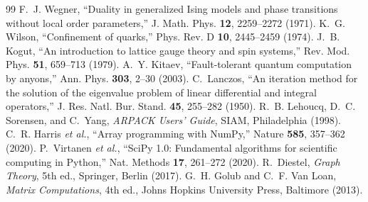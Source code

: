 \documentclass[10pt,twocolumn]{article}
\theoremstyle{definition}
\begin{document}
\begin{thebibliography}{99}\footnotesize
{} F.~J. Wegner, ``Duality in generalized Ising models and phase transitions without local order parameters,'' J. Math. Phys. \textbf{12}, 2259--2272 (1971).
 K.~G. Wilson, ``Confinement of quarks,'' Phys. Rev. D \textbf{10}, 2445--2459 (1974).
 J.~B. Kogut, ``An introduction to lattice gauge theory and spin systems,'' Rev. Mod. Phys. \textbf{51}, 659--713 (1979).
 A.~Y. Kitaev, ``Fault-tolerant quantum computation by anyons,'' Ann. Phys. \textbf{303}, 2--30 (2003).
 C.~Lanczos, ``An iteration method for the solution of the eigenvalue problem of linear differential and integral operators,'' J. Res. Natl. Bur. Stand. \textbf{45}, 255--282 (1950).
 R.~B. Lehoucq, D.~C. Sorensen, and C.~Yang, \emph{ARPACK Users' Guide}, SIAM, Philadelphia (1998).
 C.~R. Harris \emph{et al.}, ``Array programming with NumPy,'' Nature \textbf{585}, 357--362 (2020).
 P.~Virtanen \emph{et al.}, ``SciPy 1.0: Fundamental algorithms for scientific computing in Python,'' Nat. Methods \textbf{17}, 261--272 (2020).
 R.~Diestel, \emph{Graph Theory}, 5th ed., Springer, Berlin (2017).
 G.~H. Golub and C.~F. Van Loan, \emph{Matrix Computations}, 4th ed., Johns Hopkins University Press, Baltimore (2013).
\end{thebibliography}
\end{document}
